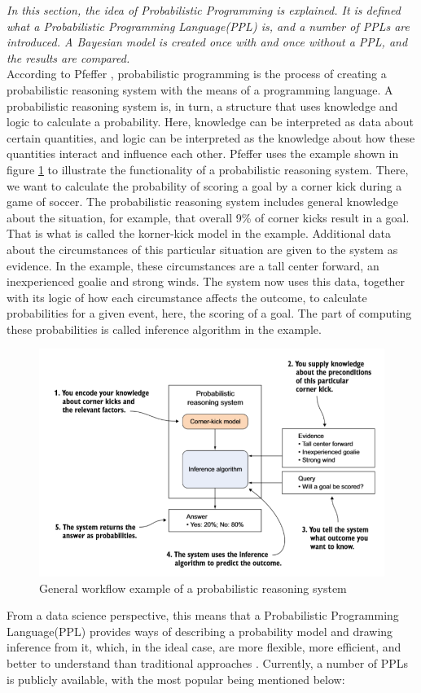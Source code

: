 \documentclass{article}
\begin{document}
\textit{In this section,  the idea of Probabilistic Programming is explained. It is defined what a Probabilistic Programming Language(PPL) is, and a number of PPLs are introduced. A Bayesian model is created once with and once without a PPL, and the results are compared.}
\\
According to Pfeffer \cite{9781617292330}, probabilistic programming is the process of creating a probabilistic reasoning system with the means of a programming language. A probabilistic reasoning system is, in turn, a structure that uses knowledge and logic to calculate a probability. Here, knowledge can be interpreted as data about certain quantities, and logic can be interpreted as the knowledge about how these quantities interact and influence each other. Pfeffer \cite{9781617292330} uses the example shown in figure \ref{fig:example_prs} to illustrate the functionality of a probabilistic reasoning system. There, we want to calculate the probability of scoring a goal by a corner kick during a game of soccer. The probabilistic reasoning system includes general knowledge about the situation, for example, that overall 9\% of corner kicks result in a goal. That is what is called the korner-kick model in the example. Additional data about the circumstances of this particular situation are given to the system as evidence. In the example, these circumstances are a tall center forward, an inexperienced goalie and strong winds. The system now uses this data, together with its logic of how each circumstance affects the outcome, to calculate probabilities for a given event, here, the scoring of a goal. The part of computing these probabilities is called inference algorithm in the example.
\begin{figure}
	\includegraphics[width=\textwidth]{images/probabilistic_reasoning_system.PNG}
	\caption[General workflow example of a probabilistic reasoning system. Source: \cite{9781617292330}]{General workflow example of a probabilistic reasoning system}
	\label{fig:example_prs}
\end{figure}
From a data science perspective, this means that a Probabilistic Programming Language(PPL) provides ways of describing a probability model and drawing inference from it, which, in the ideal case, are more flexible, more efficient, and better to understand than traditional approaches \cite{Hardesty2015}. Currently, a number of PPLs is publicly available, with the most popular being mentioned below:
\end{document}
